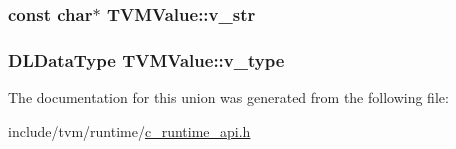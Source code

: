 \subsubsection[{\texorpdfstring{v\+\_\+str}{v_str}}]{\setlength{\rightskip}{0pt plus 5cm}const char$\ast$ T\+V\+M\+Value\+::v\+\_\+str}\hypertarget{unionTVMValue_ab0e4dea6ca370fe7a7d22f4fc23a4f47}{}\label{unionTVMValue_ab0e4dea6ca370fe7a7d22f4fc23a4f47}
\subsubsection[{\texorpdfstring{v\+\_\+type}{v_type}}]{\setlength{\rightskip}{0pt plus 5cm}D\+L\+Data\+Type T\+V\+M\+Value\+::v\+\_\+type}\hypertarget{unionTVMValue_a75af73d1e39bc5de7073a008d44b0d16}{}\label{unionTVMValue_a75af73d1e39bc5de7073a008d44b0d16}


The documentation for this union was generated from the following file\+:\begin{DoxyCompactItemize}
\item 
include/tvm/runtime/\hyperlink{c__runtime__api_8h}{c\+\_\+runtime\+\_\+api.\+h}\end{DoxyCompactItemize}
